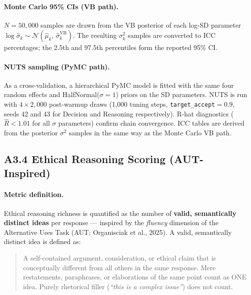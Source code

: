 \paragraph{Monte Carlo 95\% CIs (VB path).}
$N = 50{,}000$ samples are drawn from the VB posterior of each log-SD parameter
$\log\hat{\sigma}_k \sim \mathcal{N}(\hat{\mu}_k,\,\hat{\sigma}^{\text{VB}}_k)$.
The resulting $\sigma^2_k$ samples are converted to ICC percentages; the 2.5th and 97.5th
percentiles form the reported 95\% CI.

\paragraph{NUTS sampling (PyMC path).}
As a cross-validation, a hierarchical PyMC model is fitted with the same four random
effects and HalfNormal($\sigma=1$) priors on the SD parameters.  NUTS is run with
$4 \times 2{,}000$ post-warmup draws (1,000 tuning steps, \texttt{target\_accept}$=0.9$,
seeds 42 and 43 for Decision and Reasoning respectively).  R-hat diagnostics
($\hat{R} < 1.01$ for all $\sigma$ parameters) confirm chain convergence.
ICC tables are derived from the posterior $\sigma^2$ samples in the same way as the
Monte Carlo VB path.

\subsection*{A3.4 Ethical Reasoning Scoring (AUT-Inspired)}

\paragraph{Metric definition.}
Ethical reasoning richness is quantified as the number of \textbf{valid, semantically
distinct ideas} per response --- inspired by the \emph{fluency} dimension of the
Alternative Uses Task (AUT; Organisciak et al., 2025).  A valid, semantically distinct idea
is defined as:

\begin{quote}
    A self-contained argument, consideration, or ethical claim that is conceptually
    different from all others in the same response.  Mere restatements, paraphrases, or
    elaborations of the same point count as ONE idea.  Purely rhetorical filler
    (\emph{``this is a complex issue''}) does not count.
\end{quote}

